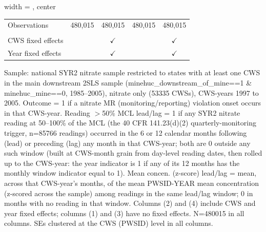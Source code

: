 \begin{table}[htbp]
\begin{adjustbox}{width = \textwidth, center}
\begin{tabular}{lcccc}
          \\
         
         Observations                                 & 480,015         & 480,015         & 480,015         & 480,015\\  
         
          \\
         
         CWS fixed effects                            &                 & $\checkmark$    &                 & $\checkmark$\\   
         Year fixed effects                           &                 & $\checkmark$    &                 & $\checkmark$\\   
         
         \bottomrule
         
      \end{tabular}
      
      
      
   \end{adjustbox}
      {\tiny\linespread{1}\selectfont \par \raggedright 
   Sample: national SYR2 nitrate sample restricted to states with at least one CWS in the main downstream 2SLS sample (minehuc\_downstream\_of\_mine==1 \& minehuc\_mine==0, 1985--2005), nitrate only (53335 CWSs), CWS-years 1997 to 2005. Outcome = 1 if a nitrate MR (monitoring/reporting) violation onset occurs in that CWS-year. Reading $>$50\% MCL lead/lag = 1 if any SYR2 nitrate reading at 50--100\% of the MCL (the 40 CFR 141.23(d)(2) quarterly-monitoring trigger, n=85766 readings) occurred in the 6 or 12 calendar months following (lead) or preceding (lag) any month in that CWS-year; both are 0 outside any such window (built at CWS-month grain from day-level reading dates, then rolled up to the CWS-year: the year indicator is 1 if any of its 12 months has the monthly window indicator equal to 1). Mean concen. (z-score) lead/lag = mean, across that CWS-year's months, of the mean PWSID-YEAR mean concentration (z-scored across the sample) among readings in the same lead/lag window; 0 in months with no reading in that window. Columns (2) and (4) include CWS and year fixed effects; columns (1) and (3) have no fixed effects. N=480015 in all columns. SEs clustered at the CWS (PWSID) level in all columns.}
   
\end{table}


